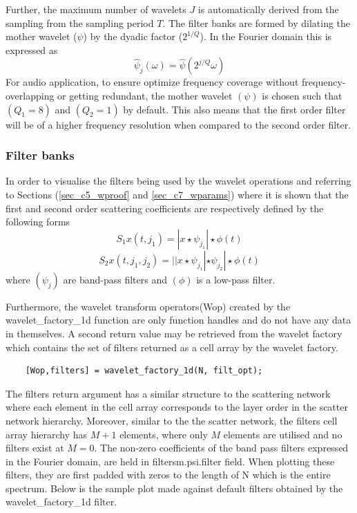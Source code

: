 Further, the maximum number of wavelets $J$ is automatically derived from the sampling from the sampling period $T$.  The filter banks are formed by dilating the mother wavelet ($\psi$) by the dyadic factor ($2^{1/Q}$).  In the Fourier domain this is expressed as
\begin{equation}
     \hat\psi_j(\omega) = \hat\psi(2^{j/Q}\omega)
     \label{eqn_c3_scat01}
\end{equation}
For audio application, to ensure optimize frequency coverage without frequency-overlapping or getting redundant, the mother wavelet $(\psi)$ is chosen such that  $(Q_1 = 8)$ and $(Q_2 = 1)$ by default. This also means that the first order filter will be of a higher frequency resolution when compared to the second order filter. 
\subsubsection{Filter banks}
In order to visualise the filters being used by the wavelet operations and referring to Sections (\ref{sec_c5_wproof} and \ref{sec_c7_wparams}) where it is shown that the first and second order scattering coefficients are respectively defined by the following forms
\begin{equation}
    S_1x(t,j_1) = |x\star\psi_{j_1}|\star\phi(t)
    \label{eqn_c3_scat02}
\end{equation}
\begin{equation}
    S_2x(t,j_1,j_2) = ||x\star\psi_{j_1}|\star\psi_{j_2}|\star\phi(t) \label{eqn_c3_scat03}
\end{equation}
where $(\psi_{j})$ are band-pass filters and $(\phi)$ is  a low-pass filter.

Furthermore, the wavelet transform operators(Wop) created by the wavelet\_factory\_1d function are only function handles and do not have any data in themselves. A second return value may be retrieved from the wavelet factory which contains the set of filters returned as a cell array by the wavelet factory.
\begin{verbatim}
    [Wop,filters] = wavelet_factory_1d(N, filt_opt);
\end{verbatim}

The filters return argument has a similar structure to the scattering network where each element in the cell array corresponds to the layer order in the scatter network hierarchy. Moreover, similar to the the scatter network, the filters cell array hierarchy has $M+1$ elements, where only $M$ elements are utilised and no filters exist at $M=0$. The non-zero coefficients of the band pass filters expressed in the Fourier domain, are held in filters{m}.psi.filter field. When plotting these filters, they are first padded with zeros to the length of N which is the entire spectrum.  Below is the sample plot made against default filters obtained by the wavelet\_factory\_1d filter.

